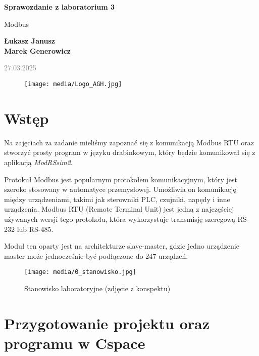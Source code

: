 \documentclass{article}
\begin{document}
\begin{titlepage}
    \begin{center}
        \vspace*{1cm}
            
        \Huge
        \textbf{Sprawozdanie z laboratorium 3}
            
        \vspace{0.5cm}
        \LARGE
        Modbus 
            
        \vspace{1.5cm}
            
        \textbf{Łukasz Janusz\\Marek Generowicz}

        \normalsize      
        \textcolor{gray}{27.03.2025}
        \vfill
        \begin{figure}[hb]
            \centering
            \texttt{[image: media/Logo\_AGH.jpg]}
        \end{figure}   
    \end{center}
\end{titlepage}

\section{Wstęp}
Na zajęciach za zadanie mieliśmy zapoznać się z komunikacją Modbus RTU oraz stworzyć prosty program w języku drabinkowym, który będzie komunikował się z aplikacją \textit{ModRSsim2}.

Protokuł Modbus jest popularnym protokołem komunikacyjnym, który jest szeroko stosowany w automatyce przemysłowej. Umożliwia on komunikację między urządzeniami, takimi jak sterowniki PLC, czujniki, napędy i inne urządzenia. Modbus RTU (Remote Terminal Unit) jest jedną z najczęściej używanych wersji tego protokołu, która wykorzystuje transmisję szeregową RS-232 lub RS-485.

Moduł ten oparty jest na architekturze slave-master, gdzie jedno urządzenie master może jednocześnie być podłączone do 247 urządzeń.

\begin{figure}[H]
    \centering
    \texttt{[image: media/0\_stanowisko.jpg]}
    \caption{Stanowisko laboratoryjne (zdjęcie z konspektu)}
    \label{fig:stanowisko}
\end{figure}


\newpage
\section{Przygotowanie projektu oraz programu w Cspace}
\end{document}
